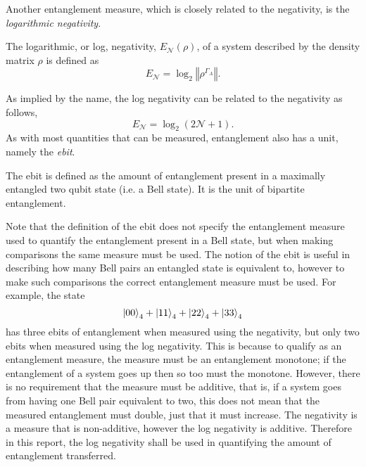 Another entanglement measure, which is closely related to the negativity, is the \emph{logarithmic negativity}.
\begin{definition}
    The logarithmic, or log, negativity, $E_\mathcal{N}(\rho)$, of a system described by the density matrix $\rho$ is defined as
    \begin{equation}
        E_\mathcal{N} = \log_2\left\Vert \rho^{\Gamma_A}\right\Vert.
    \end{equation}
\end{definition}
As implied by the name, the log negativity can be related to the negativity as follows,
\begin{equation}
    E_\mathcal{N} = \log_2\left(2\mathcal{N} + 1\right).
\end{equation}
As with most quantities that can be measured, entanglement also has a unit, namely the \emph{ebit}.
\begin{definition}[Ebit]
    The ebit is defined as the amount of entanglement present in a maximally entangled two qubit state (i.e. a Bell state). It is the unit of bipartite entanglement.
\end{definition}
Note that the definition of the ebit does not specify the entanglement measure used to quantify the entanglement present in a Bell state, but when making comparisons the same measure must be used.
The notion of the ebit is useful in describing how many Bell pairs an entangled state is equivalent to, however to make such comparisons the correct entanglement measure must be used.
For example, the state 
\begin{equation}
    \ket{00}_4 + \ket{11}_4 + \ket{22}_4 + \ket{33}_4
\end{equation}
has three ebits of entanglement when measured using the negativity, but only two ebits when measured using the log negativity.
This is because to qualify as an entanglement measure, the measure must be an entanglement monotone; if the entanglement of a system goes up then so too must the monotone. 
However, there is no requirement that the measure must be additive, that is, if a system goes from having one Bell pair equivalent to two, this does not mean that the measured entanglement must double, just that it must increase.
The negativity is a measure that is non-additive, however the log negativity is additive.
Therefore in this report, the log negativity shall be used in quantifying the amount of entanglement transferred.
